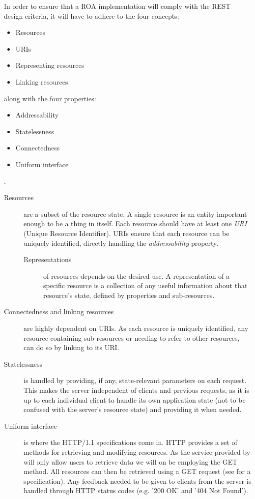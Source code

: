 In order to ensure that a ROA implementation will comply with the REST design criteria, it will have to adhere to the four concepts\cite[Chapter 4]{restful_web_services}:
\begin{itemize}
\item Resources
\item URIs
\item Representing resources
\item Linking resources
\end{itemize}
along with the four properties:
\begin{itemize}
\item Addressability
\item Statelessness
\item Connectedness
\item Uniform interface
\end{itemize}.
\begin{description}
\item[Resources] are a subset of the resource state.
A single resource is an entity important enough to be a thing in itself.
Each resource should have at least one \textit{URI} (Unique Resource Identifier).
URIs ensure that each resource can be uniquely identified, directly handling the \textit{addressability} property.

\begin{description}
\item[Representations] of resources depends on the desired use.
A representation of a specific resource is a collection of any useful information about that resource's state, defined by properties and sub-resources.
\end{description}

\item[Connectedness and linking resources] are highly dependent on URIs.
As each resource is uniquely identified, any resource containing sub-resources or needing to refer to other resources, can do so by linking to its URI.

\item[Statelessness] is handled by providing, if any, state-relevant parameters on each request.
This makes the server independent of clients and previous requests, as it is up to each individual client to handle its own application state (not to be confused with the server's resource state) and providing it when needed.

\item[Uniform interface] is where the HTTP/1.1 specifications come in.
HTTP provides a set of methods for retrieving and modifying resources.
As the service provided by \projectname{} will only allow users to retrieve data we will on be employing the GET method.
All resources can then be retrieved using a GET request (see  for a specification).
Any feedback needed to be given to clients from the server is handled through HTTP status codes (e.g. '200 OK' and '404 Not Found').
\end{description}